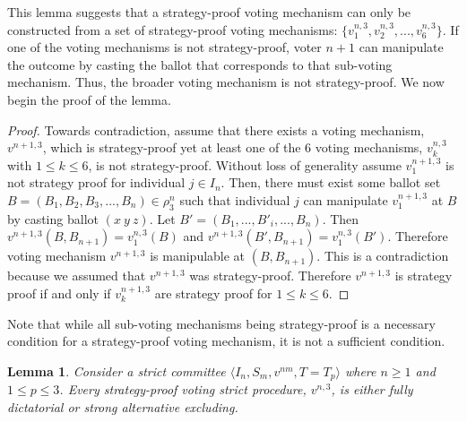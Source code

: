 \documentclass{amsart}
\newtheorem{lemma}{Lemma}
\theoremstyle{plain}
\begin{document}
This lemma suggests that a strategy-proof voting mechanism can only be constructed from a set of strategy-proof voting mechanisms: $\{v_1^{n,3}, v_2^{n,3}, ... , v_6^{n,3}\}$. If one of the voting mechanisms is not strategy-proof, voter $n+1$ can manipulate the outcome by casting the ballot that corresponds to that sub-voting mechanism. Thus, the broader voting mechanism is not strategy-proof. We now begin the proof of the lemma.

\begin{proof}

 Towards contradiction, assume that there exists a voting mechanism, $v^{n+1, 3}$, which is strategy-proof yet at least one of the 6 voting mechanisms, $v_k^{n, 3}$ with $1 \le k \le 6$, is not strategy-proof. Without loss of generality assume $v_1^{n+1, 3}$ is not strategy proof for individual $j \in I_n$. Then, there must exist some ballot set $B = (B_1, B_2, B_3, ... , B_n) \in \rho_3^n$ such that individual $j$ can manipulate $v_1^{n+1, 3}$ at $B$ by casting ballot $(x \: y \: z)$. Let $B' = (B_1, ... , B'_i, ... , B_n)$. Then $v^{n+1,3}(B, B_{n+1}) = v_1^{n,3}(B)$ and $v^{n+1,3}(B', B_{n+1}) = v_1^{n,3}(B')$. Therefore voting mechanism $v^{n+1,3}$ is manipulable at $(B, B_{n+1})$. This is a contradiction because we assumed that $v^{n+1,3}$ was strategy-proof. Therefore $v^{n+1,3}$ is strategy proof if and only if $v_k^{n+1,3}$ are strategy proof for $1 \le k \le 6$. 
\end{proof}

Note that while all sub-voting mechanisms being strategy-proof is a necessary condition for a strategy-proof voting mechanism, it is not a sufficient condition.

\begin{lemma}
    Consider a strict committee $\langle I_n, S_m, v^{nm}, T = T_p \rangle$ where $n \ge 1$ and $1 \le p \le 3$. Every strategy-proof voting strict procedure, $v^{n,3}$, is either fully dictatorial or strong alternative excluding.
\end{lemma}
\end{document}

